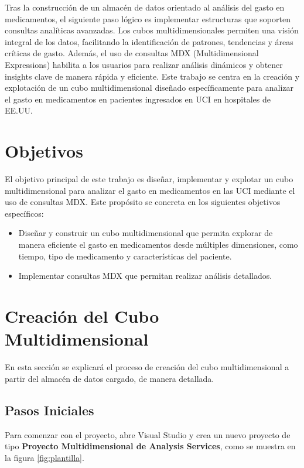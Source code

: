 \documentclass{article}
\begin{document}
Tras la construcción de un almacén de datos orientado al análisis del gasto en medicamentos, el siguiente paso lógico es implementar estructuras que soporten consultas analíticas avanzadas. Los cubos multidimensionales permiten una visión integral de los datos, facilitando la identificación de patrones, tendencias y áreas críticas de gasto. Además, el uso de consultas MDX (Multidimensional Expressions) habilita a los usuarios para realizar análisis dinámicos y obtener insights clave de manera rápida y eficiente. Este trabajo se centra en la creación y explotación de un cubo multidimensional diseñado específicamente para analizar el gasto en medicamentos en pacientes ingresados en UCI en hospitales de EE.UU.

\section{Objetivos}
\label{sec:objetivos}

El objetivo principal de este trabajo es diseñar, implementar y explotar un cubo multidimensional para analizar el gasto en medicamentos en las UCI mediante el uso de consultas MDX. Este propósito se concreta en los siguientes objetivos específicos:

\begin{itemize}
	\item Diseñar y construir un cubo multidimensional que permita explorar de manera eficiente el gasto en medicamentos desde múltiples dimensiones, como tiempo, tipo de medicamento y características del paciente.
	\item Implementar consultas MDX que permitan realizar análisis detallados.

\end{itemize}










\section{Creación del Cubo Multidimensional}
En esta sección se explicará el proceso de creación del cubo multidimensional a partir del almacén de datos cargado, de manera detallada.

\subsection{Pasos Iniciales}
Para comenzar con el proyecto, abre Visual Studio y crea un nuevo proyecto de tipo \textbf{Proyecto Multidimensional de Analysis Services}, como se muestra en la figura \ref{fig:plantilla}.
\end{document}
